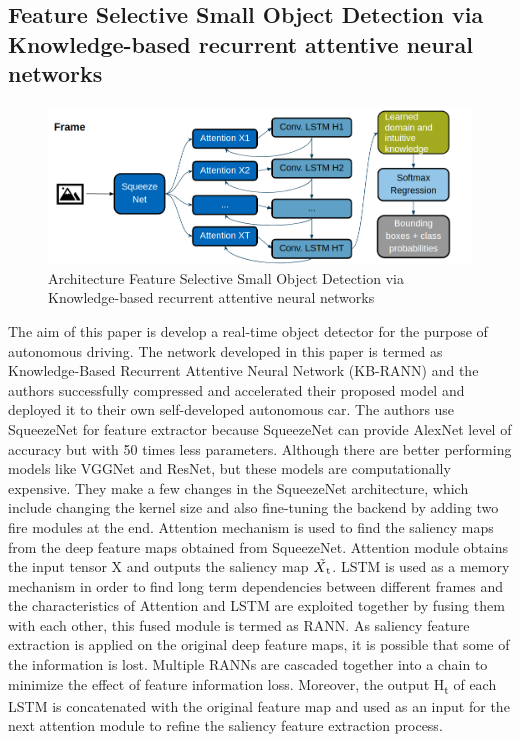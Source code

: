 \documentclass[conference]{IEEEtran}
\begin{document}
\subsection{Feature Selective Small Object Detection via Knowledge-based recurrent attentive neural networks}
\begin{figure}[h]
\includegraphics[width=\columnwidth]{KB-RANN-architecture}
\caption{Architecture Feature Selective Small Object Detection via Knowledge-based recurrent attentive neural networks}
\end{figure}
The aim of this paper is develop a real-time object detector for the purpose of autonomous driving. The network developed in this paper is termed as Knowledge-Based Recurrent Attentive Neural Network (KB-RANN) and the authors successfully compressed and accelerated their proposed model and deployed it to their own self-developed autonomous car. \newline
The authors use SqueezeNet for feature extractor because SqueezeNet can provide AlexNet level of accuracy but with 50 times less parameters. Although there are better performing models like VGGNet and ResNet, but these models are computationally expensive. They make a few changes in the SqueezeNet architecture, which include changing the kernel size and also fine-tuning the backend by adding two fire modules at the end. \newline
Attention mechanism is used to find the saliency maps from the deep feature maps obtained from SqueezeNet. Attention module obtains the input tensor X and outputs the saliency map $\tilde{X\textsubscript{t}}$. \newline
LSTM is used as a memory mechanism in order to find long term dependencies between different frames and the characteristics of Attention and LSTM are exploited together by fusing them with each other, this fused module is termed as RANN. As saliency feature extraction is applied on the original deep feature maps, it is possible that some of the information is lost. Multiple RANNs are cascaded together into a chain to minimize the effect of feature information loss. Moreover, the output H\textsubscript{t} of each LSTM is concatenated with the original feature map and used as an input for the next attention module to refine the saliency feature extraction process. \newline
\end{document}

